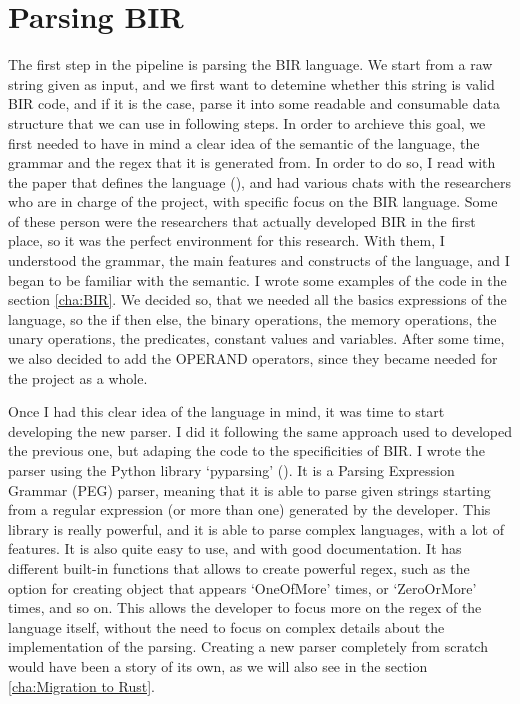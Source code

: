 \section{Parsing BIR}
\label{cha:Parsing BIR} The first step in the pipeline is parsing the BIR language.
We start from a raw string given as input, and we first want to detemine whether
this string is valid BIR code, and if it is the case, parse it into some readable
and consumable data structure that we can use in following steps. In order to
archieve this goal, we first needed to have in mind a clear idea of the semantic
of the language, the grammar and the regex that it is generated from. In order to
do so, I read with the paper that defines the language (\cite{bir_pub}), and had
various chats with the researchers who are in charge of the project, with
specific focus on the BIR language. Some of these person were the researchers that
actually developed BIR in the first place, so it was the perfect environment for
this research. With them, I understood the grammar, the main features and constructs
of the language, and I began to be familiar with the semantic. I wrote some examples
of the code in the section \ref{cha:BIR}. We decided so, that we needed all the basics
expressions of the language, so the if then else, the binary operations, the
memory operations, the unary operations, the predicates, constant values and variables.
After some time, we also decided to add the OPERAND operators, since they became
needed for the project as a whole.

Once I had this clear idea of the language in mind, it was time to start developing
the new parser. I did it following the same approach used to developed the
previous one, but adaping the code to the specificities of BIR. I wrote the
parser using the Python library `pyparsing' (\cite{pyparsing}). It is a Parsing Expression
Grammar (PEG) parser, meaning that it is able to parse given strings starting
from a regular expression (or more than one) generated by the developer. This library
is really powerful, and it is able to parse complex languages, with a lot of features.
It is also quite easy to use, and with good documentation. It has different
built-in functions that allows to create powerful regex, such as the option for creating
object that appears `OneOfMore' times, or `ZeroOrMore' times, and so on. This
allows the developer to focus more on the regex of the language itself, without the
need to focus on complex details about the implementation of the parsing.
Creating a new parser completely from scratch would have been a story of its own,
as we will also see in the section \ref{cha:Migration to Rust}.


